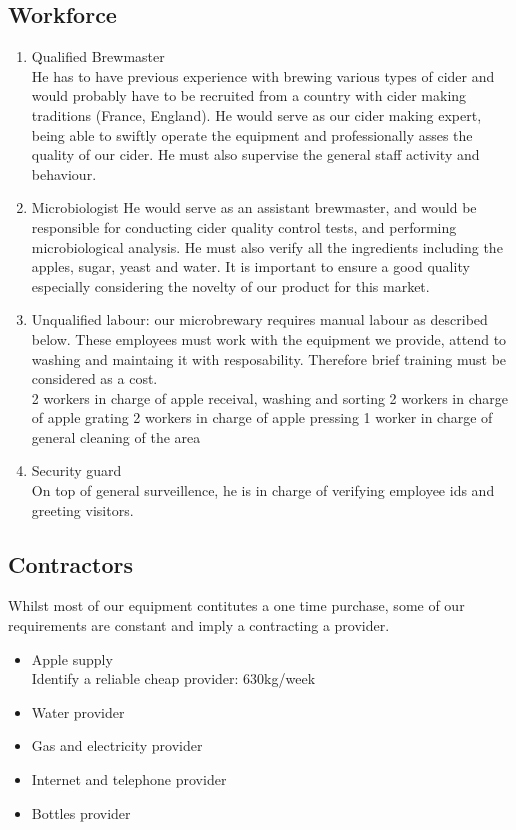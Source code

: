 \documentclass{article}
\begin{document}
  \subsection{Workforce}  
  \begin{enumerate}
  \item Qualified Brewmaster \\
He has to have previous experience with brewing various types of cider and would probably have to be recruited from a country with cider making traditions (France, England). He would serve as our cider making expert, being able to swiftly operate the equipment and professionally asses the quality of our cider. He must also supervise the general staff activity and behaviour.

  \item Microbiologist
He would serve as an assistant brewmaster, and would be responsible for conducting cider quality control tests, and performing microbiological analysis. He must also verify all the ingredients including the apples, sugar, yeast and water.
It is important to ensure a good quality especially considering the novelty of our product for this market.

  \item Unqualified labour: our microbrewary requires manual labour as described below. These employees must work with the equipment we provide, attend to washing and maintaing it with resposability. Therefore brief training must be considered as a cost. \\ 
  2 workers in charge of apple receival, washing and sorting
  2 workers in charge of apple grating
  2 workers in charge of apple pressing
  1 worker in charge of general cleaning of the area

  \item Security guard \\
On top of general surveillence, he is in charge of verifying employee ids and greeting visitors.
  \end{enumerate}

  \subsection{Contractors}
Whilst most of our equipment contitutes a one time purchase, some of our requirements are constant and imply a contracting a provider.
		\begin{itemize}
		\item Apple supply \\
    Identify a reliable cheap provider: 630kg/week
		\item Water provider \\
		\item Gas and electricity provider \\
    \item Internet and telephone provider
		\item Bottles provider
		\end{itemize}
\end{document}
